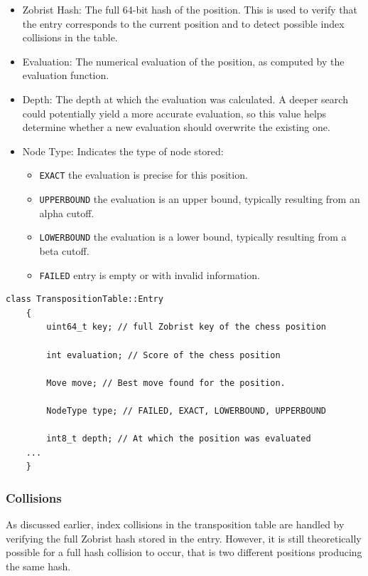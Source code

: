 \begin{itemize}
  \item Zobrist Hash: The full 64-bit hash of the position. This is used to verify that the entry corresponds to the current position and to detect possible index collisions in the table.
  \item Evaluation: The numerical evaluation of the position, as computed by the evaluation function.
  \item Depth: The depth at which the evaluation was calculated. A deeper search could potentially yield a more accurate evaluation, so this value helps determine whether a new evaluation should overwrite the existing one.
  \item Node Type: Indicates the type of node stored:
  \begin{itemize}
    \item \texttt{EXACT} the evaluation is precise for this position.
    \item \texttt{UPPERBOUND} the evaluation is an upper bound, typically resulting from an alpha cutoff.
    \item \texttt{LOWERBOUND} the evaluation is a lower bound, typically resulting from a beta cutoff.
    \item \texttt{FAILED} entry is empty or with invalid information.
  \end{itemize}
\end{itemize}

\begin{lstlisting}[breaklines=true, caption={Code example transposition table entry}, label={lst:transposition_table_entry}]
    class TranspositionTable::Entry
    {
        uint64_t key; // full Zobrist key of the chess position

        int evaluation; // Score of the chess position

        Move move; // Best move found for the position.

        NodeType type; // FAILED, EXACT, LOWERBOUND, UPPERBOUND

        int8_t depth; // At which the position was evaluated
    ...
    }
\end{lstlisting}

\subsubsection{Collisions}

As discussed earlier, index collisions in the transposition table are handled by verifying the full Zobrist hash stored in the entry. However, it is still theoretically possible for a full hash collision to occur, that is two different positions producing the same hash.

